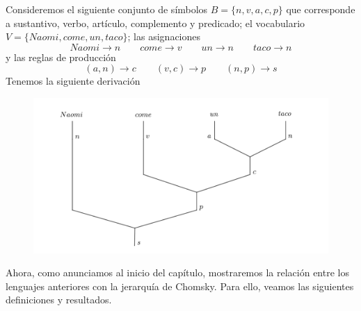 \documentclass[../main.tex]{subfiles}
\begin{document}
\begin{ej}
	Consideremos el siguiente conjunto de símbolos $B=\{ n,v,a,c,p \}$ que corresponde a sustantivo, verbo, artículo, complemento y predicado; el vocabulario $V=\{ Naomi, come, un, taco \}$; las asignaciones 
	$$Naomi \to n \qquad come \to v \qquad un \to n \qquad taco \to n$$
	y las reglas de producción 
	$$(a, n) \to c \qquad (v,c) \to p \qquad (n,p) \to s$$
	Tenemos la siguiente derivación
	\begin{figure}[H]
		\includegraphics[scale=0.35]{diagrama/derivacion2.pdf}
		\centering
	\end{figure}
\end{ej}


Ahora, como anunciamos al inicio del capítulo, mostraremos la relación entre los lenguajes anteriores con la jerarquía de Chomsky. Para ello, veamos las siguientes definiciones y resultados.
\end{document}
